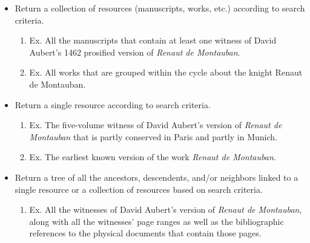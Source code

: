 \documentclass[a4paper]{article}
\begin{document}
\begin{itemize}
    \item Return a collection of resources (manuscripts, works, etc.) according to search criteria.
    \begin{enumerate}
        \item Ex. All the manuscripts that contain at least one witness of David Aubert's 1462 prosified version of \textit{Renaut de Montauban}. 
        \item Ex. All works that are grouped within the cycle about the knight Renaut de Montauban. 
    \end{enumerate}
    \item Return a single resource according to search criteria.
    \begin{enumerate}
        \item Ex. The five-volume witness of David Aubert's version of \textit{Renaut de Montauban} that is partly conserved in Paris and partly in Munich. 
        \item Ex. The earliest known version of the work \textit{Renaut de Montauban}. 
    \end{enumerate}
    \item Return a tree of all the ancestors, descendents, and/or neighbors linked to a single resource or a collection of resources based on search criteria.
    \begin{enumerate}
        \item Ex. All the witnesses of David Aubert's version of \textit{Renaut de Montauban}, along with all the witnesses' page ranges as well as the bibliographic references to the physical documents that contain those pages. \textrightarrow {}
    \end{enumerate}
\end{itemize}
\end{document}
